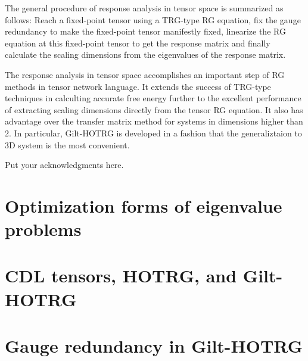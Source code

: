 \documentclass[aps,prb,reprint,superscriptaddress]{revtex4-2}
\begin{document}
The general procedure of response analysis in tensor space is summarized
as follows: Reach a fixed-point tensor using a TRG-type RG equation, fix
the gauge redundancy to make the fixed-point tensor manifestly fixed,
linearize the RG equation at this fixed-point tensor to get the response
matrix and finally calculate the scaling dimensions from the
eigenvalues of the response matrix.
%

The response analysis in tensor space accomplishes an important step of
RG methods in tensor network language. It extends the success of
TRG-type techniques in calculting accurate free energy further to
the excellent performance of extracting scaling dimensions directly from
the tensor RG equation. It also has advantage over the transfer matrix
method for systems in dimensions higher than 2. In particular,
Gilt-HOTRG is developed in a fashion that the generaliztaion to 3D
system is the most convenient.


\begin{acknowledgments}
Put your acknowledgments here.

\blindtext
\end{acknowledgments}

\appendix
\section{Optimization forms of eigenvalue problems\label{appd:opteig}}
\blindtext
\section{CDL tensors, HOTRG, and Gilt-HOTRG\label{appd:cdlHOTRG}}
\blindtext
\section{Gauge redundancy in Gilt-HOTRG\label{appd:gaugeFix}}
\blindtext



\end{document}
